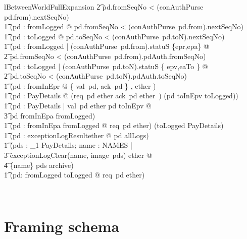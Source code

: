 \begin{LNewLemma}
\begin{theorem}{lBetweenWorldFullExpansion}
                \t2 \land pd.fromSeqNo < (conAuthPurse~ pd.from).nextSeqNo) \land \\ \t1
            (\forall pd : fromLogged @  pd.fromSeqNo < (conAuthPurse~pd.from).nextSeqNo) \land \\ \t1
            (\forall pd : toLogged @ pd.toSeqNo < (conAuthPurse~pd.toN).nextSeqNo) \land  \\ \t1
            (\forall pd : fromLogged | (conAuthPurse~pd.from).statuS \in \{epr,epa\} @  \\ %
                \t2 pd.fromSeqNo < (conAuthPurse~pd.from).pdAuth.fromSeqNo) \land \\ \t1
            (\forall pd : toLogged | (conAuthPurse~pd.toN).statuS \in \{ epv,eaTo \} @ \\ %
                \t2 pd.toSeqNo < (conAuthPurse~pd.toN).pdAuth.toSeqNo) \land \\ \t1
            (\forall pd : fromInEpr @ \disjoint \langle \{ val~pd, ack~pd \} , ether \rangle) \land \\ \t1
            (\forall pd : PayDetails @ (req~pd \in ether \land ack~pd \notin ether~)
                \iff (pd \in toInEpv \cup toLogged)) \\ \t1
            \land (\forall pd : PayDetails | val~pd \in ether \land pd \in toInEpv @ \\ %
                \t3 pd \in fromInEpa \cup fromLogged) \land \\ \t1
            (\forall pd : fromInEpa \cup fromLogged @  req~pd \in ether) \land
            (toLogged \in \finset PayDetails) \land \\ \t1
            (\forall pd : exceptionLogResult\inv \limg ether \rimg @ pd \in allLogs) \land \\ \t1
            (\forall pds : \power_1 PayDetails; name : NAMES | \\ %
                    \t3 exceptionLogClear(name, image~pds) \in ether @ \\ %
                \t4 \{name\} \cross pds \subseteq archive) \land \\ \t1
            (\forall pd: fromLogged \cup toLogged @ req~pd \in ether)
\end{theorem}~\end{LNewLemma}


\section{Framing schema}\label{ch5.phibop}

